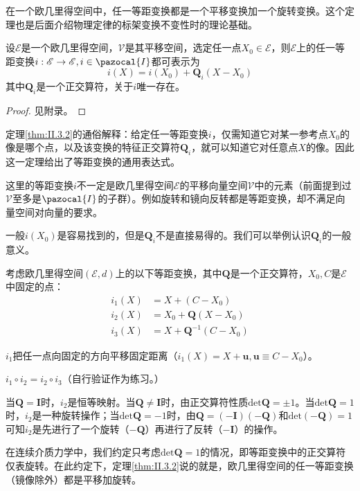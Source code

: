 \documentclass[main.tex]{subfiles}
\begin{document}
在一个欧几里得空间中，任一等距变换都是一个平移变换加一个旋转变换。这个定理也是后面介绍物理定律的标架变换不变性时的理论基础。

\begin{theorem}[等距变换的表示定理]\label{thm:II.3.2}
    设$\mathcal{E}$是一个欧几里得空间，$\mathcal{V}$是其平移空间，选定任一点$X_0\in\mathcal{E}$，则$\mathcal{E}$上的任一等距变换$i:\mathcal{E}\rightarrow\mathcal{E},i\in\pazocal{I}$都可表示为
    \[
        i\left(X\right)=i\left(X_0\right)+\mathbf{Q}_i\left(X-X_0\right)
    \]
    其中$\mathbf{Q}_i$是一个正交算符，关于$i$唯一存在。
\end{theorem}
\begin{proof}
    见附录。
\end{proof}


定理\ref{thm:II.3.2}的通俗解释：给定任一等距变换$i$，仅需知道它对某一参考点$X_0$的像是哪个点，以及该变换的特征正交算符$\mathbf{Q}_i$，就可以知道它对任意点$X$的像。因此这一定理给出了等距变换的通用表达式。

这里的等距变换$i$不一定是欧几里得空间$\mathcal{E}$的平移向量空间$\mathcal{V}$中的元素（前面提到过$\mathcal{V}$至多是$\pazocal{I}$的子群）。例如旋转和镜向反转都是等距变换，却不满足向量空间对向量的要求。

一般$i\left(X_0\right)$是容易找到的，但是$\mathbf{Q}_i$不是直接易得的。我们可以举例认识$\mathbf{Q}_i$的一般意义。

\begin{example}
    考虑欧几里得空间$\left(\mathcal{E},d\right)$上的以下等距变换，其中$\mathbf{Q}$是一个正交算符，$X_0,C$是$\mathcal{E}$中固定的点：
    \begin{align*}
        i_1\left(X\right) & =X+\left(C-X_0\right)                \\
        i_2\left(X\right) & =X_0+\mathbf{Q}\left(X-X_0\right)    \\
        i_3\left(X\right) & =X+\mathbf{Q}^{-1}\left(C-X_0\right)
    \end{align*}

    $i_1$把任一点向固定的方向平移固定距离（$i_1\left(X\right)=X+\mathbf{u},\mathbf{u}\equiv C-X_0$）。

    $i_1\circ i_2=i_2\circ i_3$（自行验证作为练习。）

    当$\mathbf{Q}=\mathbf{I}$时，$i_2$是恒等映射。当$\mathbf{Q}\neq\mathbf{I}$时，由正交算符性质$\mathrm{det}\mathbf{Q}=\pm 1$。当$\mathrm{det}\mathbf{Q}=1$时，$i_2$是一种旋转操作；当$\mathrm{det}\mathbf{Q}=-1$时，由$\mathbf{Q}=\left(-\mathbf{I}\right)\left(-\mathbf{Q}\right)$和$\mathrm{det}\left(-\mathbf{Q}\right)=1$可知$i_2$是先进行了一个旋转（$-\mathbf{Q}$）再进行了反转（$-\mathbf{I}$）的操作。
\end{example}

在连续介质力学中，我们约定只考虑$\mathrm{det}\mathbf{Q}=1$的情况，即等距变换中的正交算符仅表旋转。在此约定下，定理\ref{thm:II.3.2}说的就是，欧几里得空间的任一等距变换（镜像除外）都是平移加旋转。
\end{document}
